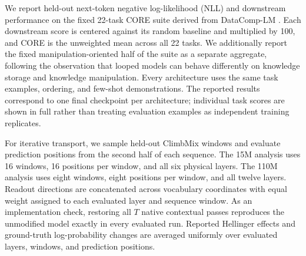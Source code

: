 \documentclass{article}
\begin{document}
We report held-out next-token negative log-likelihood (NLL) and downstream
performance on the fixed 22-task CORE suite derived from DataComp-LM
\cite{li2025datacomplmsearchgenerationtraining}. Each downstream score is
centered against its random baseline and multiplied by 100, and CORE is the
unweighted mean across all 22 tasks. We additionally report the fixed
manipulation-oriented half of the suite as a separate aggregate, following the
observation that looped models can behave differently on knowledge storage and
knowledge manipulation. Every architecture uses the same task examples,
ordering, and few-shot demonstrations. The reported results correspond to one
final checkpoint per architecture; individual task scores are shown in full
rather than treating evaluation examples as independent training replicates.

For iterative transport, we sample held-out ClimbMix windows and evaluate
prediction positions from the second half of each sequence. The 15M analysis
uses 16 windows, 16 positions per window, and all six physical layers. The 110M
analysis uses eight windows, eight positions per window, and all twelve layers.
Readout directions are concatenated across vocabulary coordinates with equal
weight assigned to each evaluated layer and sequence window. As an
implementation check, restoring all $T$ native contextual passes reproduces the
unmodified model exactly in every evaluated run. Reported Hellinger effects and
ground-truth log-probability changes are averaged uniformly over evaluated
layers, windows, and prediction positions.
\end{document}
